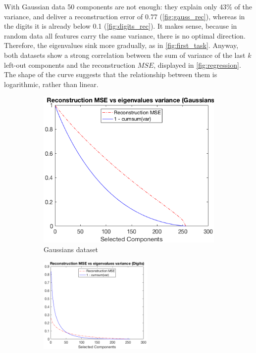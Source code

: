 \documentclass[a4paper, 10pt]{article}
\begin{document}
  With Gaussian data 50 components are not enough: they explain only 43\% of the 
  variance, and deliver a reconstruction error of 0.77 (\autoref{fig:gauss_rec}),
  whereas in the digits it is already below 0.1 (\autoref{fig:digits_rec}). 
  It makes sense, because in random data all features carry the same variance, 
  there is no optimal direction.  Therefore, the eigenvalues sink more gradually,
  as in \autoref{fig:first_task}.  Anyway, both datasets show a strong 
  correlation between the sum of variance of the last $k$ left-out components 
  and the reconstruction $MSE$, displayed in \autoref{fig:regression}. The shape
  of the curve suggests that the relationship between them is logarithmic, 
  rather than linear.

  \begin{figure}[h]
    \begin{adjustwidth}{-1cm}{-1cm}
    \centering
    \begin{subfigure}[t]{0.3\linewidth}
      \includegraphics[width=1\linewidth]{./lab3/PCA/rec_vs_invsum_gauss.png}
      \caption{Gaussians dataset}
      \label{fig:gauss_rec}
    \end{subfigure}
    \begin{subfigure}[t]{0.3\linewidth}
      \includegraphics[width=1\linewidth, height=4.7cm]{./lab3/PCA/rec_vs_invsum_digits.png}

\end{subfigure}
\end{adjustwidth}
\end{figure}
\end{document}
